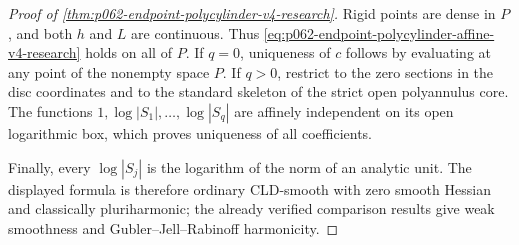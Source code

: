 \begin{proof}[Proof of \cref{thm:p062-endpoint-polycylinder-v4-research}]
Rigid points are dense in \(P\), and both \(h\) and \(L\) are continuous.
Thus \eqref{eq:p062-endpoint-polycylinder-affine-v4-research} holds on all
of \(P\).  If \(q=0\), uniqueness of \(c\) follows by evaluating at any
point of the nonempty space \(P\).  If \(q>0\), restrict to the zero
sections in the disc coordinates and to the standard skeleton of the
strict open polyannulus core.  The functions
\(1,\log|S_1|,\ldots,\log|S_q|\) are affinely independent on its open
logarithmic box, which proves uniqueness of all coefficients.

Finally, every \(\log|S_j|\) is the logarithm of the norm of an analytic
unit.  The displayed formula is therefore ordinary CLD-smooth with zero
smooth Hessian and classically pluriharmonic; the already verified
comparison results give weak smoothness and Gubler--Jell--Rabinoff
harmonicity.
\end{proof}
